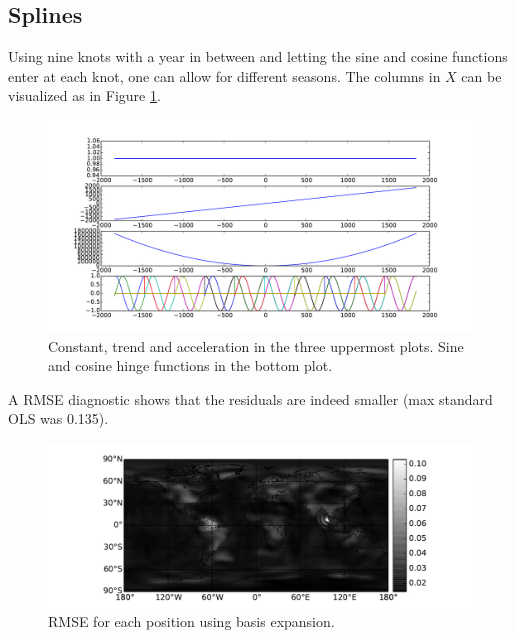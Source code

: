 \subsection{Splines}
Using nine knots with a year in between and letting the sine and cosine functions enter at each knot, one can allow for different seasons. The columns in $X$ can be visualized as in Figure \ref{fig:splines-x-columns}.
\begin{figure}[H]
	\centering
	\includegraphics[width=\textwidth]{figures/splines-x-columns}
	\caption{Constant, trend and acceleration in the three uppermost plots. Sine and cosine hinge functions in the bottom plot.}
	\label{fig:splines-x-columns}
\end{figure}

A RMSE diagnostic shows that the residuals are indeed smaller (max standard OLS was 0.135).

\begin{figure}[H]
	\centering
	\includegraphics[width=\textwidth]{figures/splines-rmse}
	\caption{RMSE for each position using basis expansion.}
	\label{fig:splines-rmse}
\end{figure}

